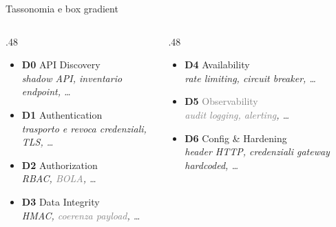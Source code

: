 
\begin{frame}{Tassonomia e box gradient}
      \begin{columns}
            \begin{column}{.48\textwidth}
                  \begin{itemize}
                        \item \textbf{D0} \alert{API Discovery}\\
                              {\scriptsize\itshape shadow API, inventario endpoint,  \dots}

                        \item \textbf{D1} \alert{Authentication}\\
                              {\scriptsize\itshape trasporto e revoca credenziali, TLS, \dots}

                        \item \textbf{D2} \alert{Authorization}\\
                              {\scriptsize\itshape RBAC, \textcolor{gray}{BOLA}, \dots}

                        \item \textbf{D3} \alert{Data Integrity}\\
                              {\scriptsize\itshape HMAC, \textcolor{gray}{coerenza payload}, \dots}
                  \end{itemize}
            \end{column}

            \begin{column}{.48\textwidth}
                  \begin{itemize}
                        \item \textbf{D4} \alert{Availability}\\
                              {\scriptsize\itshape rate limiting, circuit breaker, \dots}

                        \item \textbf{D5} \textcolor{gray}{Observability}\\
                              {\scriptsize\itshape\textcolor{gray}{audit logging, alerting}, \dots}

                        \item \textbf{D6} \alert{Config \& Hardening}\\
                              {\scriptsize\itshape header HTTP, credenziali gateway hardcoded, \dots}


\end{itemize}
\end{column}
\end{columns}
\end{frame}
